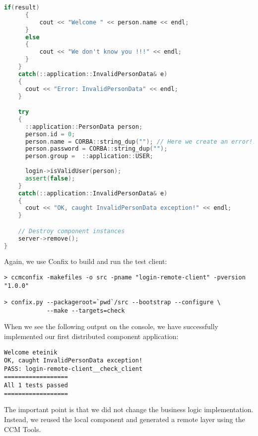 \begin{footnotesize}
\begin{lstlisting}[language=C++]
      if(result) 
      {
          cout << "Welcome " << person.name << endl;
      }
      else 
      {
          cout << "We don't know you !!!" << endl;
      }
    }
    catch(::application::InvalidPersonData& e)
    {
      cout << "Error: InvalidPersonData" << endl;	
    }

    try 
    {
      ::application::PersonData person;
      person.id = 0;
      person.name = CORBA::string_dup(""); // Here we create an error!!!
      person.password = CORBA::string_dup("");   
      person.group =  ::application::USER;       
      
      login->isValidUser(person);
      assert(false); 
    }
    catch(::application::InvalidPersonData& e)
    {
      cout << "OK, caught InvalidPersonData exception!" << endl;	
    }

    // Destroy component instances
    server->remove();
}
\end{lstlisting}
\end{footnotesize}

Again, we use Confix to build and run the test client:
\begin{footnotesize}
\begin{verbatim}
> ccmconfix -makefiles -o src -pname "login-remote-client" -pversion "1.0.0"

> confix.py --packageroot=`pwd`/src --bootstrap --configure \
            --make --targets=check
\end{verbatim}
\end{footnotesize}

When we see the following output on the console, we have successfully
implemented our first distributed component application:
\begin{footnotesize}
\begin{verbatim}
Welcome eteinik
OK, caught InvalidPersonData exception!
PASS: login-remote-client__check_client
==================
All 1 tests passed
==================
\end{verbatim}
\end{footnotesize}

The important point is that we did not change the business logic implementation.
Instead, we reused the local component and generated a remote layer using the
CCM Tools.

\newpage